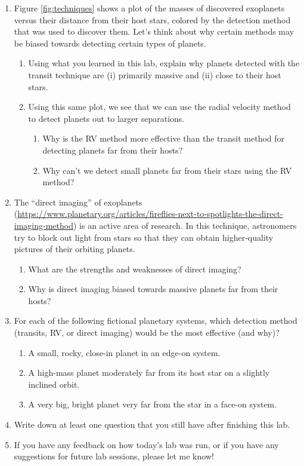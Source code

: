 \documentclass[11pt]{article}
\begin{document}
\begin{enumerate}[resume]
    \item Figure \ref{fig:techniques} shows a plot of the masses of discovered exoplanets versus their distance from their host stars, colored by the detection method that was used to discover them. Let's think about why certain methods may be biased towards detecting certain types of planets.
    \begin{enumerate}
        \item Using what you learned in this lab, explain why planets detected with the transit technique are (i) primarily massive and (ii) close to their host stars.
        
        \item Using this same plot, we see that we can use the radial velocity method to detect planets out to larger separations.
        \begin{enumerate}
            \item Why is the RV method more effective than the transit method for detecting planets far from their hosts?
            
            \item Why can't we detect small planets far from their stars using the RV method?
        \end{enumerate}
    \end{enumerate}
    
    \item The ``direct imaging'' of exoplanets  (\url{https://www.planetary.org/articles/fireflies-next-to-spotlights-the-direct-imaging-method}) is an active area of research. In this technique, astronomers try to block out light from stars so that they can obtain higher-quality pictures of their orbiting planets.  
    \begin{enumerate}
        \item What are the strengths and weaknesses of direct imaging?
        
        \item Why is direct imaging biased towards massive planets far from their hosts?
    \end{enumerate}
    
    \item For each of the following fictional planetary systems, which detection method (transits, RV, or direct imaging) would be the most effective (and why)? 
    \begin{enumerate}
        \item A small, rocky, close-in planet in an edge-on system.
        \item A high-mass planet moderately far from its host star on a slightly inclined orbit.
        \item A very big, bright planet very far from the star in a face-on system.
    \end{enumerate}
    
    \item Write down at least one question that you still have after finishing this lab.
    
    \item If you have any feedback on how today's lab was run, or if you have any suggestions for future lab sessions, please let me know!
\end{enumerate}
\end{document}
